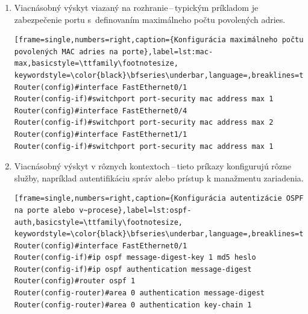 \begin{enumerate}
\begin{minipage}{\linewidth}		
	\begin{lstlisting}[frame=single,numbers=right,caption={Konfigurácia AAA serveru},label=lst:aaa-server,basicstyle=\ttfamily\footnotesize, keywordstyle=\color{black}\bfseries\underbar,language=,breaklines=true]
	Router(config)#radius server RAD_SERV
	Router(config-radius-server)#address ipv4 10.0.0.8
	Router(config-radius-server)#key PASSWD
	Router(config)#tacacs server RAD_SERV
	Router(config-tacacs-server)#address ipv4 10.0.0.9
	Router(config-tacacs-server)#key PASSWD
	\end{lstlisting}
\end{minipage}		
\newpage	
	\item \vspace{2em} Viacnásobný výskyt viazaný na rozhranie\,--\,typickým príkladom je zabezpečenie portu s~definovaním maximálneho počtu povolených  adries.
	
\begin{minipage}{\linewidth}		
\begin{lstlisting}[frame=single,numbers=right,caption={Konfigurácia maximálneho počtu povolených MAC adries na porte},label=lst:mac-max,basicstyle=\ttfamily\footnotesize, keywordstyle=\color{black}\bfseries\underbar,language=,breaklines=true]
Router(config)#interface FastEthernet0/1
Router(config-if)#switchport port-security mac address max 1
Router(config)#interface FastEthernet0/4
Router(config-if)#switchport port-security mac address max 2
Router(config)#interface FastEthernet1/1
Router(config-if)#switchport port-security mac address max 1
\end{lstlisting}
\end{minipage}

	\item \vspace{2em} Viacnásobný výskyt v rôznych kontextoch\,--\,tieto príkazy konfigurujú rôzne služby, napríklad autentifikáciu správ  alebo prístup k manažmentu zariadenia.

\begin{minipage}{\linewidth}		
\begin{lstlisting}[frame=single,numbers=right,caption={Konfigurácia autentizácie OSPF na porte alebo v~procese},label=lst:ospf-auth,basicstyle=\ttfamily\footnotesize, keywordstyle=\color{black}\bfseries\underbar,language=,breaklines=true]
Router(config)#interface FastEthernet0/1
Router(config-if)#ip ospf message-digest-key 1 md5 heslo
Router(config-if)#ip ospf authentication message-digest
Router(config)#router ospf 1
Router(config-router)#area 0 authentication message-digest
Router(config-router)#area 0 authentication key-chain 1
\end{lstlisting}
\end{minipage}
	

\end{enumerate}
